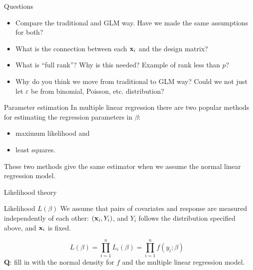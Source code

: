 \documentclass[
  ignorenonframetext,
]{beamer}
\providecommand{\tightlist}{%
  \setlength{\itemsep}{0pt}\setlength{\parskip}{0pt}}
\begin{document}
\begin{frame}
\begin{block}{Questions}
\label{questions}
\begin{itemize}
\tightlist
\item
  Compare the traditional and GLM way. Have we made the same assumptions
  for both?
\item
  What is the connection between each \({\bf x}_i\) and the design
  matrix?
\item
  What is ``full rank''? Why is this needed? Example of rank less than
  \(p\)?
\item
  Why do you think we move from traditional to GLM way? Could we not
  just let \(\varepsilon\) be from binomial, Poisson, etc. distribution?
\end{itemize}
\end{block}
\end{frame}

\begin{frame}{Parameter estimation}
\label{parameter-estimation}
In multiple linear regression there are two popular methods for
estimating the regression parameters in \(\beta\):

\begin{itemize}
\tightlist
\item
  maximum likelihood and
\item
  least squares.
\end{itemize}

These two methods give the same estimator when we assume the normal
linear regression model.
\end{frame}

\begin{frame}
\begin{block}{Likelihood theory}
\label{likelihood-theory}
\begin{block}{Likelihood \(L(\beta)\)}
\label{likelihood-lbeta}
We assume that pairs of covariates and response are measured
independently of each other: \(({\bf x}_i,Y_i)\), and \(Y_i\) follows
the distribution specified above, and \({\bf x}_i\) is fixed.

\[L(\beta)=\prod_{i=1}^n L_i(\beta)=\prod_{i=1}^n f(y_i; \beta)\]
\textbf{Q}: fill in with the normal density for \(f\) and the multiple
linear regression model.
\end{block}
\end{block}
\end{frame}
\end{document}
